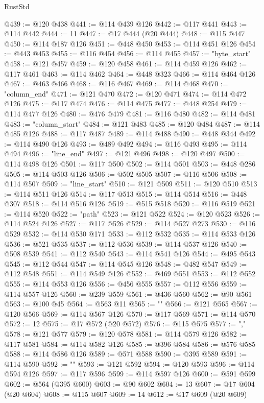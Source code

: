 \begin{lexlean}{RustStd}
\begin{coremodule}
@439 := @120 @438
@441 := @114 @439 @126
@442 := @117 @441
@443 := @114 @442
@444 := 11
@447 := @17 @444 (@20 @444)
@448 := @115 @447
@450 := @114 @187 @126
@451 := @448 @450
@453 := @114 @451 @126
@454 := @443 @453
@455 := @116 @454
@456 := @114 @455
@457 := "byte_start"
@458 := @121 @457
@459 := @120 @458
@461 := @114 @459 @126
@462 := @117 @461
@463 := @114 @462
@464 := @448 @323
@466 := @114 @464 @126
@467 := @463 @466
@468 := @116 @467
@469 := @114 @468
@470 := "column_end"
@471 := @121 @470
@472 := @120 @471
@474 := @114 @472 @126
@475 := @117 @474
@476 := @114 @475
@477 := @448 @254
@479 := @114 @477 @126
@480 := @476 @479
@481 := @116 @480
@482 := @114 @481
@483 := "column_start"
@484 := @121 @483
@485 := @120 @484
@487 := @114 @485 @126
@488 := @117 @487
@489 := @114 @488
@490 := @448 @344
@492 := @114 @490 @126
@493 := @489 @492
@494 := @116 @493
@495 := @114 @494
@496 := "line_end"
@497 := @121 @496
@498 := @120 @497
@500 := @114 @498 @126
@501 := @117 @500
@502 := @114 @501
@503 := @448 @286
@505 := @114 @503 @126
@506 := @502 @505
@507 := @116 @506
@508 := @114 @507
@509 := "line_start"
@510 := @121 @509
@511 := @120 @510
@513 := @114 @511 @126
@514 := @117 @513
@515 := @114 @514
@516 := @448 @307
@518 := @114 @516 @126
@519 := @515 @518
@520 := @116 @519
@521 := @114 @520
@522 := "path"
@523 := @121 @522
@524 := @120 @523
@526 := @114 @524 @126
@527 := @117 @526
@529 := @114 @527 @273
@530 := @116 @529
@532 := @114 @530 @171
@533 := @112 @532
@535 := @114 @533 @126
@536 := @521 @535
@537 := @112 @536
@539 := @114 @537 @126
@540 := @508 @539
@541 := @112 @540
@543 := @114 @541 @126
@544 := @495 @543
@545 := @112 @544
@547 := @114 @545 @126
@548 := @482 @547
@549 := @112 @548
@551 := @114 @549 @126
@552 := @469 @551
@553 := @112 @552
@555 := @114 @553 @126
@556 := @456 @555
@557 := @112 @556
@559 := @114 @557 @126
@560 := @239 @559
@561 := @436 @560
@562 := @90 @561
@563 := @100 @45
@564 := @563 @11
@565 := "{"
@566 := @121 @565
@567 := @120 @566
@569 := @114 @567 @126
@570 := @117 @569
@571 := @114 @570
@572 := 12
@575 := @17 @572 (@20 @572)
@576 := @115 @575
@577 := ","
@578 := @121 @577
@579 := @120 @578
@581 := @114 @579 @126
@582 := @117 @581
@584 := @114 @582 @126
@585 := @396 @584
@586 := @576 @585
@588 := @114 @586 @126
@589 := @571 @588
@590 := @395 @589
@591 := @114 @590
@592 := "}"
@593 := @121 @592
@594 := @120 @593
@596 := @114 @594 @126
@597 := @117 @596
@599 := @114 @597 @126
@600 := @591 @599
@602 := @564 (@395 @600)
@603 := @90 @602
@604 := 13
@607 := @17 @604 (@20 @604)
@608 := @115 @607
@609 := 14
@612 := @17 @609 (@20 @609)

\end{coremodule}
\end{lexlean}
